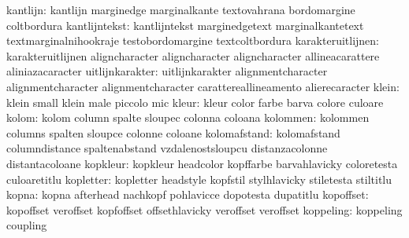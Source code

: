                  kantlijn: kantlijn                  marginedge
                           marginalkante             textovahrana
                           bordomargine              coltbordura
            kantlijntekst: kantlijntekst             marginedgetext
                           marginalkantetext         textmarginalnihookraje
                           testobordomargine         textcoltbordura
        karakteruitlijnen: karakteruitlijnen         aligncharacter
                           aligncharacter            aligncharacter
                           allineacarattere          aliniazacaracter %
          uitlijnkarakter: uitlijnkarakter           alignmentcharacter
                           alignmentcharacter        alignmentcharacter
                           carattereallineamento     alierecaracter %
                    klein: klein                     small
                           klein                     male
                           piccolo                   mic
                    kleur: kleur                     color
                           farbe                     barva
                           colore                    culoare
                    kolom: kolom                     column
                           spalte                    sloupec
                           colonna                   coloana
                 kolommen: kolommen                  columns
                           spalten                   sloupce
                           colonne                   coloane
             kolomafstand: kolomafstand              columndistance
                           spaltenabstand            vzdalenostsloupcu
                           distanzacolonne           distantacoloane
                 kopkleur: kopkleur                  headcolor
                           kopffarbe                 barvahlavicky
                           coloretesta               culoaretitlu
                kopletter: kopletter                 headstyle
                           kopfstil                  stylhlavicky
                           stiletesta                stiltitlu
                    kopna: kopna                     afterhead
                           nachkopf                  pohlavicce
                           dopotesta                 dupatitlu
                kopoffset: kopoffset                 veroffset
                           kopfoffset                offsethlavicky
                           veroffset                 veroffset %
                koppeling: koppeling                 coupling
